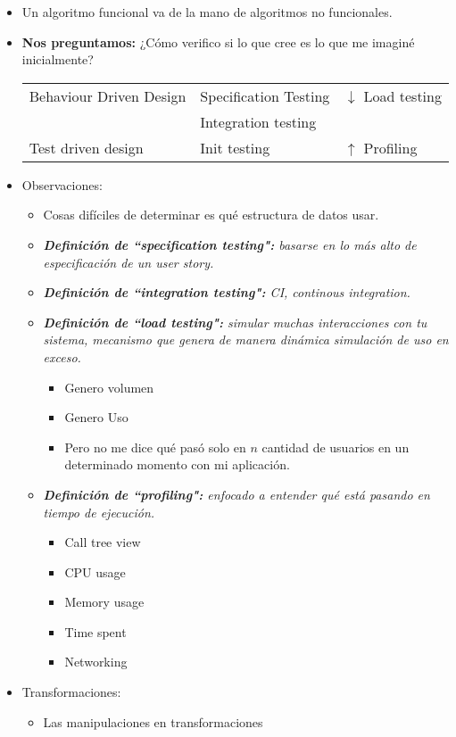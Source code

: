 \begin{itemize}
    \item Un algoritmo funcional va de la mano de algoritmos no funcionales. 
    \item \textbf{Nos preguntamos:} ¿Cómo verifico si lo que cree es lo que me imaginé inicialmente?
        \begin{center}
           \begin{tabular}{ | p{5cm} | p{5cm} | p{5cm} | }
               \hline
                   Behaviour Driven Design & Specification Testing & $\downarrow$ Load testing     \\
                   & Integration testing & \\ 
                   Test driven design & Init testing & $\uparrow$ Profiling \\ 
               \hline
           \end{tabular}
        \end{center}
    
    \item Observaciones: 
        \begin{itemize}
            \item Cosas difíciles de determinar es qué estructura de datos usar.
            \item \emph{\textbf{Definición de ``specification testing":} basarse en lo más alto de especificación de un user story.}
            \item \emph{\textbf{Definición de ``integration testing":} CI, continous integration.}
            \item \emph{\textbf{Definición de ``load testing":} simular muchas interacciones con tu sistema, mecanismo que genera de manera dinámica simulación de uso en exceso.}
                \begin{itemize}
                    \item Genero volumen
                    \item Genero Uso 
                    \item Pero no me dice qué pasó solo en $n$ cantidad de usuarios en un determinado momento con mi aplicación. 
                \end{itemize}

            \item \emph{\textbf{Definición de ``profiling":} enfocado a entender qué está pasando en tiempo de ejecución.}
                \begin{itemize}
                    \item Call tree view 
                    \item CPU usage 
                    \item Memory usage 
                    \item Time spent 
                    \item Networking 
                \end{itemize}
        \end{itemize}
    
    \item Transformaciones: 
        \begin{itemize}
            \item Las manipulaciones en transformaciones 
        \end{itemize}
\end{itemize}
